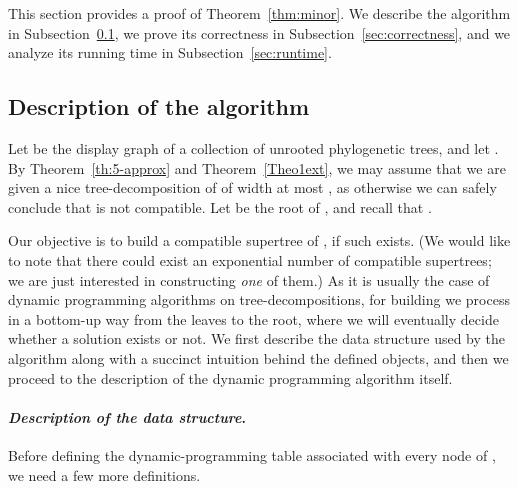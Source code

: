 

This section provides a proof of Theorem~\ref{thm:minor}. We describe the algorithm in Subsection~\ref{sec:description}, we prove its correctness in Subsection~\ref{sec:correctness}, and we analyze its running time in Subsection~\ref{sec:runtime}.


\subsection{Description of the algorithm} 
\label{sec:description}

Let    be the display graph of a collection  of unrooted phylogenetic trees, and let . By Theorem~\ref{th:5-approx} and Theorem~\ref{Theo1ext}, we may assume that we are given a
nice tree-decomposition  of  of width at most , as otherwise we can safely conclude that  is not compatible. Let   be the root of , and recall that .

Our objective is to build a compatible supertree  of , if such exists. (We would like to note that there could exist an exponential number of compatible supertrees; we are just interested in constructing {\sl one} of them.) As it is usually the case of dynamic programming algorithms on tree-decompositions, for building  we process  in a bottom-up way from the leaves to the root, where we will eventually decide whether a solution exists or not. We first describe the data structure used by the algorithm along with a succinct intuition behind the defined objects, and then we proceed to the description of the dynamic programming algorithm itself.






\paragraph{\textbf{\emph{Description of the data structure}}.} Before defining the dynamic-programming table associated with every node  of , we need a few more definitions.

